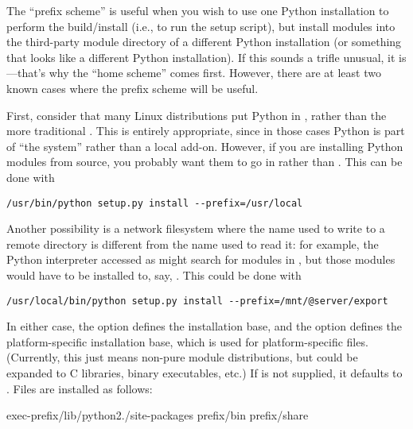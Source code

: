 \documentclass{howto}
\begin{document}
The ``prefix scheme'' is useful when you wish to use one Python
installation to perform the build/install (i.e., to run the setup
script), but install modules into the third-party module directory of a
different Python installation (or something that looks like a different
Python installation).  If this sounds a trifle unusual, it is---that's
why the ``home scheme'' comes first.  However, there are at least two
known cases where the prefix scheme will be useful.

First, consider that many Linux distributions put Python in ,
rather than the more traditional .  This is entirely
appropriate, since in those cases Python is part of ``the system''
rather than a local add-on.  However, if you are installing Python
modules from source, you probably want them to go in
 rather than
.  This can be done with

\begin{verbatim}
/usr/bin/python setup.py install --prefix=/usr/local
\end{verbatim}

Another possibility is a network filesystem where the name used to write
to a remote directory is different from the name used to read it: for
example, the Python interpreter accessed as 
might search for modules in ,
but those modules would have to be installed to, say,
.  This
could be done with

\begin{verbatim}
/usr/local/bin/python setup.py install --prefix=/mnt/@server/export
\end{verbatim}

In either case, the  option defines the
installation base, and the  option defines
the platform-specific installation base, which is used for
platform-specific files.  (Currently, this just means non-pure module
distributions, but could be expanded to C libraries, binary executables,
etc.)  If  is not supplied, it defaults to
.  Files are installed as follows:

              {exec-prefix}{/lib/python2./site-packages}
              {prefix}{/bin}
              {prefix}{/share}
\end{document}
